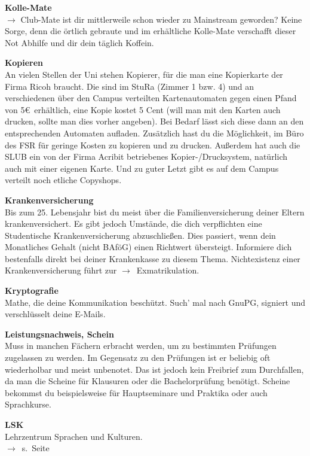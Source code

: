 \begin{multicols}{2}
\vfill\columnbreak%

\textbf{Kolle-Mate}\\
$\rightarrow$ Club-Mate ist dir mittlerweile schon wieder zu Mainstream geworden? Keine Sorge, denn die örtlich gebraute und im \ascii{} erhältliche Kolle-Mate verschafft dieser Not Abhilfe und dir dein täglich Koffein.

\textbf{Kopieren} \\
An vielen Stellen der Uni stehen Kopierer, für die man eine Kopierkarte der Firma Ricoh braucht. Die sind im StuRa (Zimmer 1 bzw. 4) und an verschiedenen über den Campus verteilten Kartenautomaten gegen einen Pfand von 5\euro\ erhältlich, eine Kopie kostet 5 Cent (will man mit den Karten auch drucken, sollte man dies vorher angeben).
Bei Bedarf lässt sich diese dann an den entsprechenden Automaten aufladen.
Zusätzlich hast du die Möglichkeit, im Büro des FSR für geringe Kosten zu kopieren und zu drucken.
Außerdem hat auch die SLUB ein von der Firma Acribit betriebenes Kopier-/Drucksystem, natürlich auch mit einer eigenen Karte.
Und zu guter Letzt gibt es auf dem Campus verteilt noch etliche Copyshops.

\textbf{Krankenversicherung} \\
Bis zum 25. Lebensjahr bist du meist über die Familienversicherung deiner Eltern krankenversichert.
Es gibt jedoch Umstände, die dich verpflichten eine Studentische Krankenversicherung abzuschließen.
Dies passiert, wenn dein Monatliches Gehalt (nicht BAföG) einen Richtwert übersteigt.
Informiere dich bestenfalls direkt bei deiner Krankenkasse zu diesem Thema.
Nichtexistenz einer Krankenversicherung führt zur \mbox{$\rightarrow$~Exmatrikulation}.

\textbf{Kryptografie} \\
Mathe, die deine Kommunikation beschützt.
Such' mal nach GnuPG, signiert und verschlüsselt deine E-Mails.

\textbf{Leistungsnachweis, Schein} \\
Muss in manchen Fächern erbracht werden, um zu bestimmten Prüfungen zugelassen zu werden.
Im Gegensatz zu den Prüfungen ist er beliebig oft wiederholbar und meist unbenotet.
Das ist jedoch kein Freibrief zum Durchfallen, da man die Scheine für Klausuren oder die Bachelorprüfung benötigt.
Scheine bekommst du beispielsweise für Hauptseminare und Praktika oder auch Sprachkurse.

\textbf{LSK} \\
Lehrzentrum Sprachen und Kulturen.\\
$\rightarrow$~s.~Seite~\pageref{sec:sprachausbildung}


\end{multicols}
